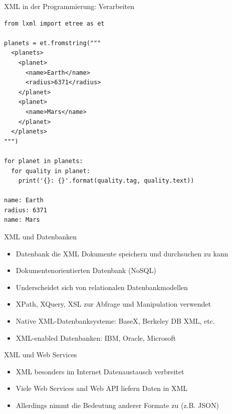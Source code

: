 \documentclass{beamer}
\begin{document}
\begin{frame}[fragile]{XML in der Programmierung: Verarbeiten}

	\lstset{language=Python}
	\scriptsize
	\begin{lstlisting}
from lxml import etree as et

planets = et.fromstring("""
  <planets>
    <planet>
      <name>Earth</name>
      <radius>6371</radius>
    </planet>
    <planet>
      <name>Mars</name>
    </planet>
  </planets>
""")

for planet in planets:
  for quality in planet:
    print('{}: {}'.format(quality.tag, quality.text))
    
name: Earth
radius: 6371
name: Mars
	\end{lstlisting}
	
\end{frame}

\begin{frame}{XML und Datenbanken}
	
	\begin{itemize}
		\item Datenbank die XML Dokumente speichern und durchsuchen zu kann
		\item Dokumentenorientierten Datenbank (NoSQL)
		\item Underscheidet sich von relationalen Datenbankmodellen
		\item XPath, XQuery, XSL zur Abfrage und Manipulation verwendet
		\item Native XML-Datenbanksysteme: BaseX, Berkeley DB XML, etc.
		\item XML-enabled Datenbanken: IBM, Oracle, Microsoft
	\end{itemize}
	
\end{frame}

\begin{frame}{XML und Web Services}
	
	\begin{itemize}
		\item XML besonders im Internet Datenaustausch verbreitet
		\item Viele Web Services and Web API liefern Daten in XML
		\item Allerdings nimmt die Bedeutung anderer Formate zu (z.B. JSON)
	\end{itemize}
	
\end{frame}
\end{document}
